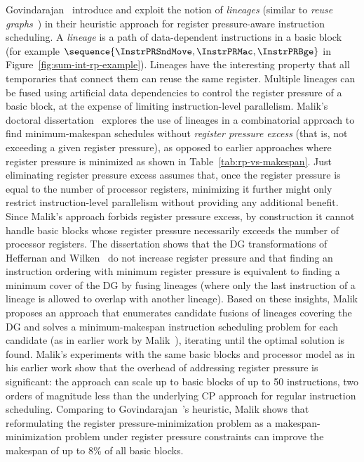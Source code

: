 \documentclass[acmsmall,authorversion,nonacm]{acmart}
\begin{document}
Govindarajan~\etal{} introduce and exploit the notion of
\emph{lineages} (similar to \emph{reuse
  graphs}~\cite{Berson1996,Touati2002}) in their heuristic approach
for register pressure-aware instruction scheduling.
A \emph{lineage} is a path of data-dependent instructions in a basic
block (for example
$\sequence{\InstrPRSndMove,\InstrPRMac,\InstrPRBge}$ in
Figure~\ref{fig:sum-int-rp-example}).
Lineages have the interesting property that all temporaries that
connect them can reuse the same register.
Multiple lineages can be fused using artificial data dependencies to
control the register pressure of a basic block, at the expense of
limiting instruction-level parallelism.
Malik's doctoral dissertation~\cite[Chapter 5]{Malik2008c} explores
the use of lineages in a combinatorial approach to find
minimum-makespan schedules without \emph{register pressure excess}
(that is, not exceeding a given register pressure), as opposed to
earlier approaches where register pressure is minimized as shown in
Table~\ref{tab:rp-vs-makespan}.
Just eliminating register pressure excess assumes that, once the
register pressure is equal to the number of processor registers,
minimizing it further might only restrict instruction-level
parallelism without providing any additional benefit.
Since Malik's approach forbids register pressure excess, by
construction it cannot handle basic blocks whose register pressure
necessarily exceeds the number of processor registers.
The dissertation shows that the DG transformations of Heffernan and
Wilken~\cite{Heffernan2006} do not increase register pressure and that
finding an instruction ordering with minimum register pressure is
equivalent to finding a minimum cover of the DG by fusing lineages
(where only the last instruction of a lineage is allowed to overlap
with another lineage).
Based on these insights, Malik proposes an approach that enumerates
candidate fusions of lineages covering the DG and solves a
minimum-makespan instruction scheduling problem for each candidate (as
in earlier work by Malik~\etal{}), iterating until the optimal
solution is found.
Malik's experiments with the same basic blocks and processor model as
in his earlier work show that the overhead of addressing register
pressure is significant: the approach can scale up to basic blocks of
up to 50 instructions, two orders of magnitude less than the
underlying CP approach for regular instruction scheduling.
Comparing to Govindarajan~\etal{}'s heuristic, Malik shows that
reformulating the register pressure-minimization problem as a
makespan-minimization problem under register pressure constraints can
improve the makespan of up to 8\% of all basic blocks.
\end{document}
